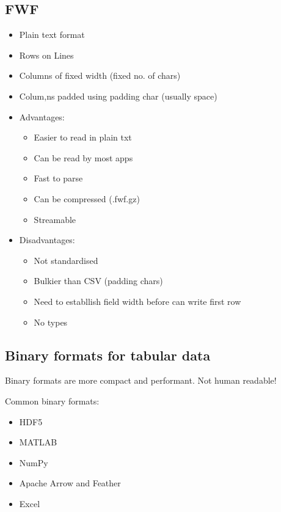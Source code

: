 \documentclass[a4paper]{article}
\begin{document}
\subsection{FWF}
\begin{itemize}
	\item Plain text format
	\item Rows on Lines
	\item Columns of fixed width (fixed no. of chars)
	\item Colum,ns padded using padding char (usually space)
	\item Advantages:
	\begin{itemize}
		\item Easier to read in plain txt
		\item Can be read by most apps
		\item Fast to parse
		\item Can be compressed (.fwf.gz)
		\item Streamable
	\end{itemize}
	\item Disadvantages:
	\begin{itemize}
		\item Not standardised
		\item Bulkier than CSV (padding chars)
		\item Need to establlish field width before can write first row
		\item No types
	\end{itemize}
\end{itemize}
\subsection{Binary formats for tabular data}
Binary formats are more compact and performant. Not human readable!
\par Common binary formats:
\begin{itemize}
	\item HDF5
	\item MATLAB
	\item NumPy
	\item Apache Arrow and Feather
	\item Excel
\end{itemize}
\end{document}
